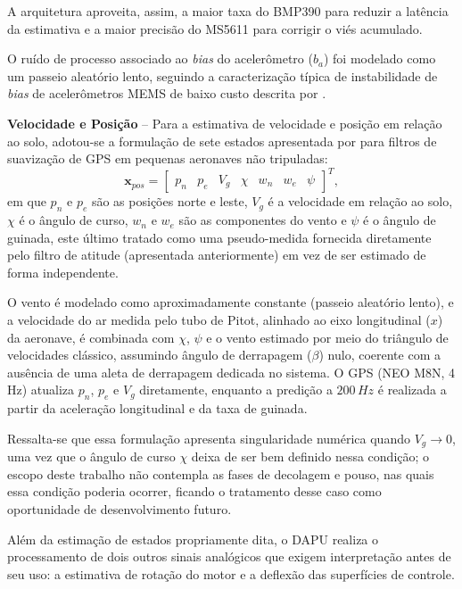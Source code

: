 A arquitetura aproveita, assim, a maior taxa do BMP390 para reduzir a latência da estimativa e a maior precisão do MS5611 para corrigir o viés acumulado.

O ruído de processo associado ao \textit{bias} do acelerômetro ($b_a$) foi modelado como um passeio aleatório lento, seguindo a caracterização típica de instabilidade de \textit{bias} de acelerômetros MEMS de baixo custo descrita por \cite{groves2013principles}.


\textbf{Velocidade e Posição} -- Para a estimativa de velocidade e posição em relação ao solo, adotou-se a formulação de sete estados apresentada por \cite{beard2012small} para filtros de suavização de GPS em pequenas aeronaves não tripuladas:
\begin{equation}
    \mathbf{x}_{pos} = \begin{bmatrix} p_n & p_e & V_g & \chi & w_n & w_e & \psi \end{bmatrix}^T,
\end{equation}
em que $p_n$ e $p_e$ são as posições norte e leste, $V_g$ é a velocidade em relação ao solo, $\chi$ é o ângulo de curso, $w_n$ e $w_e$ são as componentes do vento e $\psi$ é o ângulo de guinada, este último tratado como uma pseudo-medida fornecida diretamente pelo filtro de atitude (apresentada anteriormente) em vez de ser estimado de forma independente.

O vento é modelado como aproximadamente constante (passeio aleatório lento), e a velocidade do ar medida pelo tubo de Pitot, alinhado ao eixo longitudinal ($x$) da aeronave, é combinada com $\chi$, $\psi$ e o vento estimado por meio do triângulo de velocidades clássico, assumindo ângulo de derrapagem ($\beta$) nulo, coerente com a ausência de uma aleta de derrapagem dedicada no sistema. O GPS (NEO M8N, 4 Hz) atualiza $p_n$, $p_e$ e $V_g$ diretamente, enquanto a predição a $200\,Hz$ é realizada a partir da aceleração longitudinal e da taxa de guinada.

Ressalta-se que essa formulação apresenta singularidade numérica quando $V_g \to 0$, uma vez que o ângulo de curso $\chi$ deixa de ser bem definido nessa condição; o escopo deste trabalho não contempla as fases de decolagem e pouso, nas quais essa condição poderia ocorrer, ficando o tratamento desse caso como oportunidade de desenvolvimento futuro.

Além da estimação de estados propriamente dita, o DAPU realiza o processamento de dois outros sinais analógicos que exigem interpretação antes de seu uso: a estimativa de rotação do motor e a deflexão das superfícies de controle.

